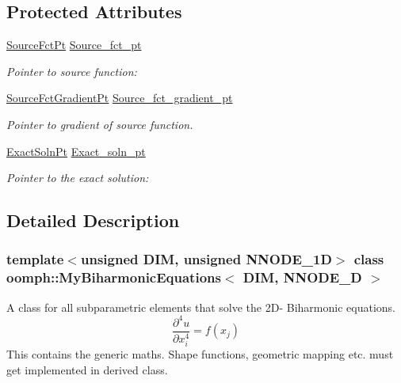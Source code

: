 \subsection*{Protected Attributes}
\begin{DoxyCompactItemize}
\item 
\hyperlink{classoomph_1_1MyBiharmonicEquations_a17bd58054c66229016eb1c52eab36bc1}{Source\+Fct\+Pt} \hyperlink{classoomph_1_1MyBiharmonicEquations_aa96fd779e04f5c726f2535f43210e905}{Source\+\_\+fct\+\_\+pt}
\begin{DoxyCompactList}\small\item\em Pointer to source function\+: \end{DoxyCompactList}\item 
\hyperlink{classoomph_1_1MyBiharmonicEquations_af007c03701e888fed7375cb4537f0046}{Source\+Fct\+Gradient\+Pt} \hyperlink{classoomph_1_1MyBiharmonicEquations_afbd71d4a6c31f36d88bf60697c4140aa}{Source\+\_\+fct\+\_\+gradient\+\_\+pt}
\begin{DoxyCompactList}\small\item\em Pointer to gradient of source function. \end{DoxyCompactList}\item 
\hyperlink{classoomph_1_1MyBiharmonicEquations_a20238fec79ab67b90f3be58ea498e681}{Exact\+Soln\+Pt} \hyperlink{classoomph_1_1MyBiharmonicEquations_abaac7831443ec4aaa927753f607a79a1}{Exact\+\_\+soln\+\_\+pt}
\begin{DoxyCompactList}\small\item\em Pointer to the exact solution\+: \end{DoxyCompactList}\end{DoxyCompactItemize}


\subsection{Detailed Description}
\subsubsection*{template$<$unsigned D\+IM, unsigned N\+N\+O\+D\+E\+\_\+1D$>$\newline
class oomph\+::\+My\+Biharmonic\+Equations$<$ D\+I\+M, N\+N\+O\+D\+E\+\_\+D $>$}

A class for all subparametric elements that solve the 2\+D-\/ Biharmonic equations. \[ \frac{\partial^4 u}{\partial x_i^4} = f(x_j) \] This contains the generic maths. Shape functions, geometric mapping etc. must get implemented in derived class.

